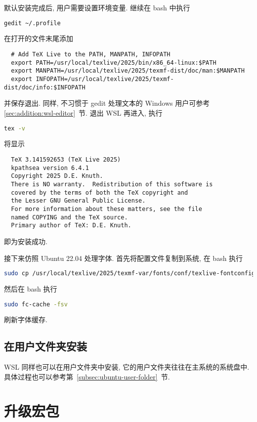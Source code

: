 默认安装完成后, 用户需要设置环境变量.
继续在 \textsf{bash} 中执行
\begin{lstlisting}[language = bash]
  gedit ~/.profile
\end{lstlisting}
在打开的文件末尾添加
\begin{lstlisting}
  # Add TeX Live to the PATH, MANPATH, INFOPATH
  export PATH=/usr/local/texlive/2025/bin/x86_64-linux:$PATH
  export MANPATH=/usr/local/texlive/2025/texmf-dist/doc/man:$MANPATH
  export INFOPATH=/usr/local/texlive/2025/texmf-dist/doc/info:$INFOPATH
\end{lstlisting}
并保存退出.
同样,
不习惯于 \textsf{gedit} 处理文本的 Windows 用户可参考 \ref{sec:addition:wsl-editor}~节.
退出 WSL 再进入,
执行
\begin{lstlisting}[language=bash]
  tex -v
\end{lstlisting}
将显示
\begin{lstlisting}
  TeX 3.141592653 (TeX Live 2025)
  kpathsea version 6.4.1
  Copyright 2025 D.E. Knuth.
  There is NO warranty.  Redistribution of this software is
  covered by the terms of both the TeX copyright and
  the Lesser GNU General Public License.
  For more information about these matters, see the file
  named COPYING and the TeX source.
  Primary author of TeX: D.E. Knuth.
\end{lstlisting}
即为安装成功.

接下来仿照 Ubuntu 22.04 处理字体.
首先将配置文件复制到系统,
在 \textsf{bash} 执行
\begin{lstlisting}[language=bash]
  sudo cp /usr/local/texlive/2025/texmf-var/fonts/conf/texlive-fontconfig.conf /etc/fonts/conf.d/09-texlive.conf
\end{lstlisting}
然后在 \textsf{bash} 执行
\begin{lstlisting}[language=bash]
  sudo fc-cache -fsv
\end{lstlisting}
刷新字体缓存.

\subsection{在用户文件夹安装}

WSL 同样也可以在用户文件夹中安装,
它的用户文件夹往往在主系统的系统盘中.
具体过程也可以参考第~\ref{subsec:ubuntu-user-folder}~节.

\section{升级宏包}

